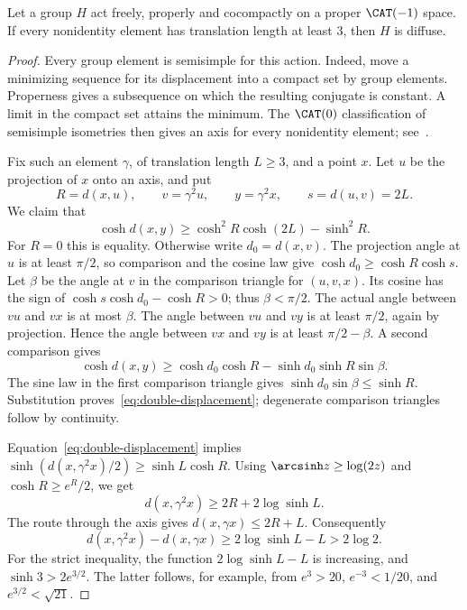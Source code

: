 \begin{lemma}\label{lem:diffuse-metric}
Let a group \(H\) act freely, properly and cocompactly on a proper
\(\CAT(-1)\) space. If every nonidentity element has translation
length at least \(3\), then \(H\) is diffuse.
\end{lemma}

\begin{proof}
Every group element is semisimple for this action. Indeed, move a
minimizing sequence for its displacement into a compact set by group
elements. Properness gives a subsequence on which the resulting
conjugate is constant. A limit in the compact set attains the minimum.
The \(\CAT(0)\) classification of semisimple isometries then gives
an axis for every nonidentity element; see~\cite[Theorem~II.6.8]{BH}.

Fix such an element \(\gamma\), of translation length \(L\ge3\),
and a point \(x\). Let \(u\) be the projection of \(x\) onto an
axis, and put
\[
 R=d(x,u),\qquad v=\gamma^2u,\qquad y=\gamma^2x,
 \qquad s=d(u,v)=2L.
\]
We claim that
\begin{equation}\label{eq:double-displacement}
 \cosh d(x,y)\ge\cosh^2R\cosh(2L)-\sinh^2R.
\end{equation}
For \(R=0\) this is equality. Otherwise write \(d_0=d(x,v)\).
The projection angle at \(u\) is at least \(\pi/2\), so comparison
and the cosine law give \(\cosh d_0\ge\cosh R\cosh s\).
Let \(\beta\) be the angle at \(v\) in the comparison triangle for
\((u,v,x)\). Its cosine has the sign of
\(\cosh s\cosh d_0-\cosh R>0\); thus \(\beta<\pi/2\).
The actual angle between \(vu\) and \(vx\) is at most \(\beta\).
The angle between \(vu\) and \(vy\) is at least \(\pi/2\), again
by projection. Hence the angle between \(vx\) and \(vy\) is at
least \(\pi/2-\beta\). A second comparison gives
\[
 \cosh d(x,y)\ge\cosh d_0\cosh R
                     -\sinh d_0\sinh R\sin\beta.
\]
The sine law in the first comparison triangle gives
\(\sinh d_0\sin\beta\le\sinh R\).
Substitution proves~\eqref{eq:double-displacement}; degenerate
comparison triangles follow by continuity.

Equation~\eqref{eq:double-displacement} implies
\(\sinh(d(x,\gamma^2x)/2)\ge\sinh L\cosh R\).
Using \(\arcsinh z\ge\log(2z)\) and \(\cosh R\ge e^R/2\), we get
\[
 d(x,\gamma^2x)\ge2R+2\log\sinh L.
\]
The route through the axis gives \(d(x,\gamma x)\le2R+L\).
Consequently
\begin{equation}\label{eq:displacement-gap}
 d(x,\gamma^2x)-d(x,\gamma x)
 \ge2\log\sinh L-L>2\log2.
\end{equation}
For the strict inequality, the function \(2\log\sinh L-L\) is
increasing, and \(\sinh3>2e^{3/2}\). The latter follows, for example,
from \(e^3>20\), \(e^{-3}<1/20\), and \(e^{3/2}<\sqrt{21}\).


\end{proof}
